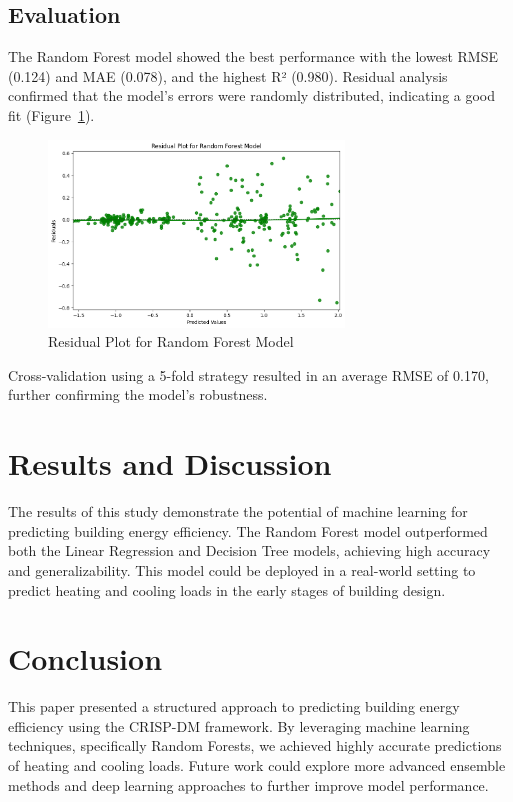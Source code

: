 \documentclass[12pt]{article}
\begin{document}
\subsection{Evaluation}
The Random Forest model showed the best performance with the lowest RMSE (0.124) and MAE (0.078), and the highest R² (0.980). Residual analysis confirmed that the model's errors were randomly distributed, indicating a good fit (Figure~\ref{fig:residuals}).

\begin{figure}[H]
    \centering
    \includegraphics[width=0.7\textwidth]{residuals.png}
    \caption{Residual Plot for Random Forest Model}
    \label{fig:residuals}
\end{figure}

Cross-validation using a 5-fold strategy resulted in an average RMSE of 0.170, further confirming the model’s robustness.

\section{Results and Discussion}
The results of this study demonstrate the potential of machine learning for predicting building energy efficiency. The Random Forest model outperformed both the Linear Regression and Decision Tree models, achieving high accuracy and generalizability. This model could be deployed in a real-world setting to predict heating and cooling loads in the early stages of building design.

\section{Conclusion}
This paper presented a structured approach to predicting building energy efficiency using the CRISP-DM framework. By leveraging machine learning techniques, specifically Random Forests, we achieved highly accurate predictions of heating and cooling loads. Future work could explore more advanced ensemble methods and deep learning approaches to further improve model performance.
\end{document}
